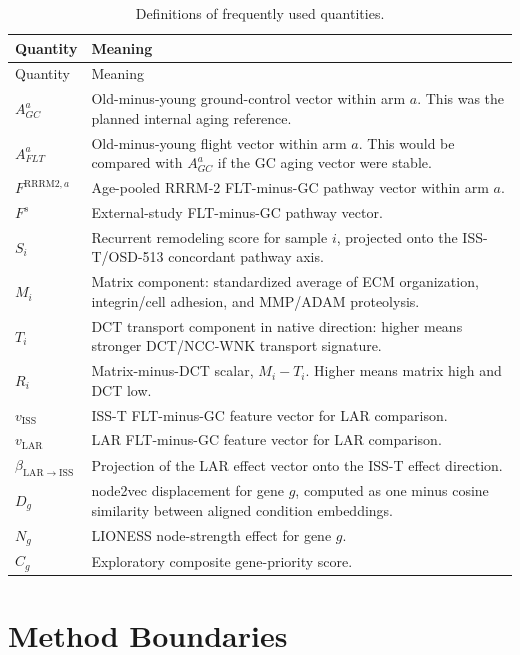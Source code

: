 \documentclass[11pt]{article}
\begin{document}
\begin{longtable}{p{}p{}}
\caption{Definitions of frequently used quantities.}\\
\toprule
Quantity & Meaning \\
\midrule
\endfirsthead
\toprule
Quantity & Meaning \\
\midrule
\endhead
$A^a_{GC}$ & Old-minus-young ground-control vector within arm $a$. This was the planned internal aging reference. \\
$A^a_{FLT}$ & Old-minus-young flight vector within arm $a$. This would be compared with $A^a_{GC}$ if the GC aging vector were stable. \\
$F^{\mathrm{RRRM2},a}$ & Age-pooled RRRM-2 FLT-minus-GC pathway vector within arm $a$. \\
$F^s$ & External-study FLT-minus-GC pathway vector. \\
$S_i$ & Recurrent remodeling score for sample $i$, projected onto the ISS-T/OSD-513 concordant pathway axis. \\
$M_i$ & Matrix component: standardized average of ECM organization, integrin/cell adhesion, and MMP/ADAM proteolysis. \\
$T_i$ & DCT transport component in native direction: higher means stronger DCT/NCC-WNK transport signature. \\
$R_i$ & Matrix-minus-DCT scalar, $M_i-T_i$. Higher means matrix high and DCT low. \\
$v_{\mathrm{ISS}}$ & ISS-T FLT-minus-GC feature vector for LAR comparison. \\
$v_{\mathrm{LAR}}$ & LAR FLT-minus-GC feature vector for LAR comparison. \\
$\beta_{\mathrm{LAR}\rightarrow\mathrm{ISS}}$ & Projection of the LAR effect vector onto the ISS-T effect direction. \\
$D_g$ & node2vec displacement for gene $g$, computed as one minus cosine similarity between aligned condition embeddings. \\
$N_g$ & LIONESS node-strength effect for gene $g$. \\
$C_g$ & Exploratory composite gene-priority score. \\
\bottomrule
\end{longtable}

\section{Method Boundaries}
\end{document}

